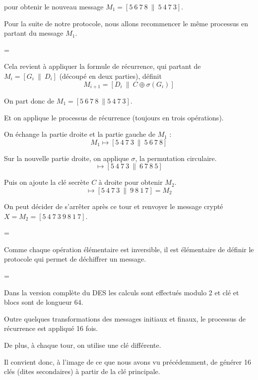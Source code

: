 \change 

pour obtenir le nouveau message $M_1 =  [5\  6\  7\  8\  \| \ 5\  4\  7\  3]$.


\diapo

Pour la suite de notre protocole, nous allons recommencer le même processus en partant du message $M_1$. 

=

Cela revient à appliquer la formule de récurrence,
qui partant de $M_i=[G_i \ \| \ D_i]$ (découpé en deux parties), définit
$$M_{i+1} = [ D_i \ \| \ C \oplus \sigma(G_i)]$$


\change

On part donc de $M_1 = [5\  6\  7\  8\  \| 5\  4\  7\  3]$.

Et on applique le processus de récurrence (toujours en trois opérations).


\change

On échange la partie droite et la partie gauche de $M_1$ :
$$M_1  \longmapsto  [5\  4\  7\  3\  \| \ 5\  6\  7\  8]$$

\change

Sur la nouvelle partie droite, on applique $\sigma$, la permutation circulaire.
$$\longmapsto  [5\  4\  7\  3\  \| \ 6\  7\  8\  5]$$

\change

Puis on ajoute la clé secrète $C$ à droite pour obtenir $M_2$.
$$\longmapsto  [5\  4\  7\  3\  \| \ 9\  8\  1\  7] = M_2$$


\change

On peut décider de s'arrêter après ce tour et renvoyer 
le message crypté $X=M_2 = [5\  4\  7\  3\ 9\  8\  1\  7]$. 

=

Comme chaque opération élémentaire est inversible, 
il est élémentaire de définir le protocole qui permet de déchiffrer un message.

=

Dans la version complète du DES les calculs sont effectués modulo 2 et clé et blocs sont de longueur $64$.

Outre quelques transformations des messages initiaux et finaux, le processus de récurrence est appliqué 16 fois. 

De plus, à chaque tour, on utilise une clé différente.

Il convient donc, à l'image de ce que nous avons vu précédemment, de générer 16 clés (dites secondaires) à partir de la clé principale.




